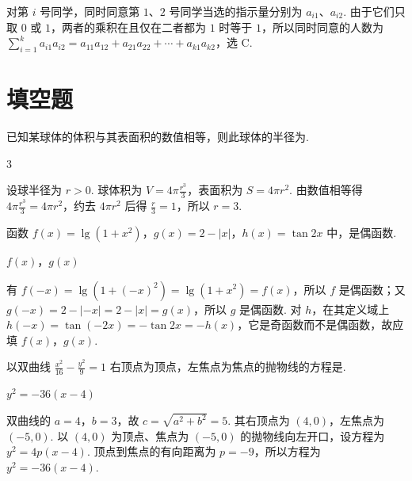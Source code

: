 \begin{solution}
对第 \(i\) 号同学，同时同意第 \(1\)、\(2\) 号同学当选的指示量分别为 \(a_{i1}\)、\(a_{i2}\). 由于它们只取 \(0\) 或 \(1\)，两者的乘积在且仅在二者都为 \(1\) 时等于 \(1\)，所以同时同意的人数为 \(\sum_{i=1}^k a_{i1}a_{i2}=a_{11}a_{12}+a_{21}a_{22}+\cdots+a_{k1}a_{k2}\)，选 C.
\end{solution}

\section{填空题}
\begin{problem}
已知某球体的体积与其表面积的数值相等，则此球体的半径为\fillinblank{}.
\end{problem}

\begin{answer}
\(3\)
\end{answer}

\begin{solution}
设球半径为 \(r>0\). 球体积为 \(V=4\pi \frac{r^3}{3}\)，表面积为 \(S=4\pi r^2\). 由数值相等得 \(4\pi \frac{r^3}{3}=4\pi r^2\)，约去 \(4\pi r^2\) 后得 \(\frac{r}{3}=1\)，所以 \(r=3\).
\end{solution}

\begin{problem}
函数 \(f(x) = \lg(1 + x^2)\)，\(g(x) = 2 - |x|\)，\(h(x) = \tan 2x\) 中，\fillinblank{}是偶函数.
\end{problem}

\begin{answer}
\(f(x)\)，\(g(x)\)
\end{answer}

\begin{solution}
有 \(f(-x)=\lg(1+(-x)^2)=\lg(1+x^2)=f(x)\)，所以 \(f\) 是偶函数；又 \(g(-x)=2-|-x|=2-|x|=g(x)\)，所以 \(g\) 是偶函数. 对 \(h\)，在其定义域上 \(h(-x)=\tan(-2x)=-\tan2x=-h(x)\)，它是奇函数而不是偶函数，故应填 \(f(x)\)，\(g(x)\).
\end{solution}

\begin{problem}
以双曲线 \(\frac{x^{2}}{16} - \frac{y^{2}}{9} = 1\) 右顶点为顶点，左焦点为焦点的抛物线的方程是\fillinblank{}.
\end{problem}

\begin{answer}
\(y^2=-36(x-4)\)
\end{answer}

\begin{solution}
双曲线的 \(a=4\)，\(b=3\)，故 \(c=\sqrt{a^2+b^2}=5\). 其右顶点为 \((4,0)\)，左焦点为 \((-5,0)\). 以 \((4,0)\) 为顶点、焦点为 \((-5,0)\) 的抛物线向左开口，设方程为 \(y^2=4p(x-4)\). 顶点到焦点的有向距离为 \(p=-9\)，所以方程为 \(y^2=-36(x-4)\).
\end{solution}


